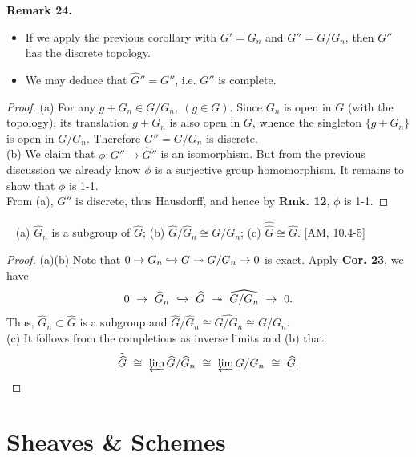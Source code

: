 \documentclass[12pt,a4paper,footinclude=true,headinclude=true]{scrbook} %
\newenvironment{corollary}[2][]
{\renewcommand\theinnercustomcol{#2}\innercustomcol[#1]
\begin{mdframed}[backgroundcolor=gray!20]\ }
{\end{mdframed}\endinnercustomcol}
\newenvironment{remark}[2][Remark]
    { \begin{mdframed}[backgroundcolor=gray!20] \textbf{#1 #2.} }
    {  \end{mdframed}}
\begin{document}
\begin{remark}{24}
    \begin{itemize}
        \item[(a)] If we apply the previous corollary with $G'=G_n$ and $G''=G/G_n$, then $G''$ has the discrete topology.
        \item[(b)] We may deduce that $\widehat{G}''=G''$, i.e. $G''$ is complete.
    \end{itemize}
\end{remark}
\begin{proof}
    (a) For any $g+G_n\in G/G_n,\ (g\in G)$. Since $G_n$ is open in $G$ (with the topology), its translation $g+G_n$ is also open in $G$, whence the singleton $\{g+G_n\}$ is open in $G/G_n$. Therefore $G''=G/G_n$ is discrete.\\
    (b) We claim that $\phi:G''\to\widehat{G}''$ is an isomorphism. But from the previous discussion we already know $\phi$ is a surjective group homomorphism. It remains to show that $\phi$ is 1-1.\\ From (a), $G''$ is discrete, thus Hausdorff, and hence by \textbf{Rmk. 12}, $\phi$ is 1-1.
\end{proof}

\begin{corollary}{25}
    (a) $\widehat{G}_n$ is a subgroup of $\widehat{G}$; (b) $\widehat{G}/\widehat{G}_n\cong G/G_n$; (c) $\widehat{\widehat{G}}\cong\widehat{G}$. [AM, 10.4-5]
\end{corollary}
\begin{proof}
    (a)(b) Note that $0\to G_n\xhookrightarrow{} G\twoheadrightarrow G/G_n\to 0$ is exact. Apply \textbf{Cor. 23}, we have
    \begin{align*}
        0\ \to\ \widehat{G}_n\ \xhookrightarrow{}\ \widehat{G}\ \twoheadrightarrow\ \widehat{G/G_n}\ \to\ 0. 
    \end{align*}
    Thus, $\widehat{G}_n\subset\widehat{G}$ is a subgroup and $\widehat{G}/\widehat{G}_n\cong\widehat{G/G_n}\cong G/G_n$.\\
    (c) It follows from the completions as inverse limits and (b) that:
    \begin{align*}
        \widehat{\widehat{G}}\ \cong\ \varprojlim\widehat{G}/\widehat{G}_n\ \cong\ \varprojlim G/G_n\ \cong\ \widehat{G}.
    \end{align*}
\end{proof}

    
\chapter{Sheaves \& Schemes}
    
\end{document}
